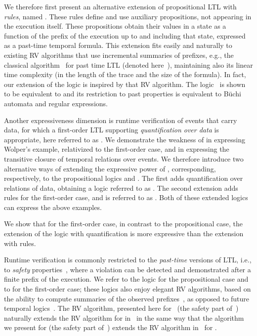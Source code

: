 We therefore first present an alternative 
extension of  propositional LTL with {\em rules},
named \ELTL{}. These rules define and use
auxiliary propositions, not appearing in the execution itself. These propositions obtain their values in a state as a 
function of the prefix of the execution
up to and including that state, expressed as 
a past-time temporal formula. This extension fits
easily and naturally to existing RV algorithms that
use incremental
summaries of prefixes, e.g., the classical algorithm~\cite{HR}
for past time LTL (denoted here~\PLTL{}), maintaining also its linear time complexity (in the length of
the trace and the size of the formula).
In fact, our extension of the logic is inspired by that RV algorithm.
The logic~\ELTL{}
is shown to be equivalent to \QLTL{}
and its restriction to past properties is equivalent to 
B\"{u}chi automata and regular expressions.

Another expressiveness dimension is runtime verification of events that carry 
data, for which a first-order LTL supporting {\em quantification over data}
is appropriate, here referred to as \FLTL.
We demonstrate the weakness of \FLTL{} in
expressing Wolper's example, relativized to the first-order 
case,  and in expressing
the transitive closure of temporal relations over events. 
We therefore introduce two alternative ways 
of extending the expressive power of \FLTL{}, corresponding, respectively, to the propositional logics \QLTL{} and \ELTL{}. 
The first adds 
  quantification over relations of data, obtaining a logic 
referred to as \QFLTL{}.
The second extension adds rules for the first-order case, and is referred to as \EFLTL. Both of these extended logics can express the above examples.

We show that for the first-order case, in contrast to the propositional case, the extension of the logic with  quantification is more expressive than the extension with
rules.
\iffalse
While
it is not clear how to construct a monitoring
algorithm for \QFLTL{}, for which we 
can construct a monitoring
algorithm. 
\fi

Runtime verification is commonly restricted to
the {\em past-time} versions of LTL, i.e.,
to {\em safety} properties~\cite{AS}, where
a violation can be detected and demonstrated
after a finite prefix of the execution.
We refer to the logic
\PLTL{} for the propositional case and to \PFLTL{} for the first-order case; 
these logics also enjoy elegant RV algorithms, based on the ability to compute summaries of the observed
prefixes~\cite{HR,HPU}, as opposed to future
temporal logics~\cite{KV}.  The RV algorithm, presented here
for~\EPFLTL{} (the safety part of~\EFLTL{})
naturally
extends the RV algorithm for \PFLTL{} in~\cite{HPU} 
in the same way that the algorithm we present for \EPLTL{}
(the safety part of~\ELTL{}) extends the RV algorithm
in~\cite{HR} for \PLTL{}.

